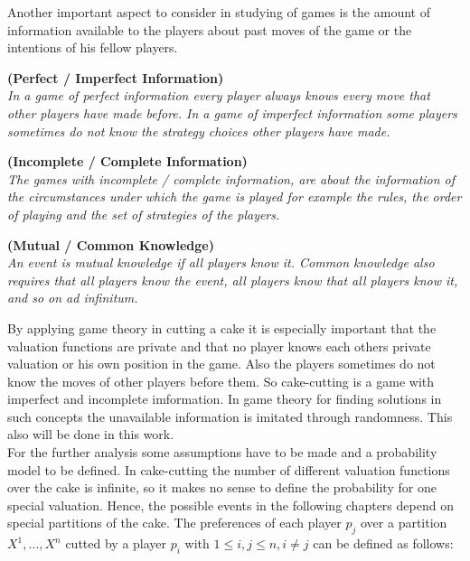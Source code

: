 \newline
Another important aspect to consider in studying of games is the amount of information available to the players about past moves of the game or the intentions of his fellow players. 
\begin{defi}{\textbf{(Perfect / Imperfect Information)}}\\
\emph{In a game of \emph{perfect information} every player always knows every move that other players have made before. In a game of \emph{imperfect information} some players sometimes do not know the strategy choices other players have made.}
\end{defi}
\begin{defi}{\textbf{(Incomplete / Complete Information)}}\\
\emph{The games with \emph{incomplete / complete information}, are about the information of the circumstances under which the game is played for example the rules, the order of playing and the set of strategies of the players.}
\end{defi}
\begin{defi}{\textbf{(Mutual / Common Knowledge)}}\\
\emph{An event is \emph{mutual knowledge} if all players know it. \emph{Common knowledge} also requires that all players know the event, all players know that all players know it, and so on ad infinitum.}
\end{defi}
By applying game theory in cutting a cake it is especially important that the valuation functions are private and that no player knows each others private valuation or his own position in the game. Also the players sometimes do not know the moves of other players before them. So cake-cutting is a game with imperfect and incomplete imformation. In game theory for finding solutions in such concepts the unavailable information is imitated through randomness. This also will be done in this work.\\For the further analysis some assumptions have to be made and a probability model to be defined. In cake-cutting the number of different valuation functions over the cake is infinite, so it makes no sense to define the probability for one special valuation. Hence, the possible events in the following chapters depend on special partitions of the cake. The preferences of each player $p_j$ over a partition $X^1, \ldots, X^n$ cutted by a player $p_i$ with $1 \leq i,j \leq n, i \neq j$ can be defined as follows:    
